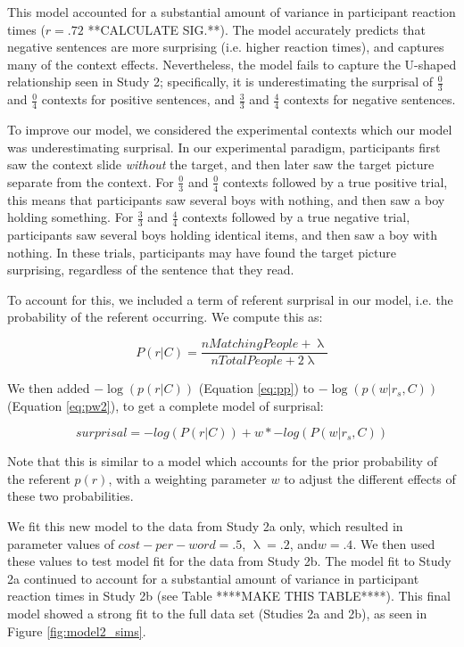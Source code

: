 \documentclass[10pt,letterpaper]{article}
\begin{document}
This model accounted for a substantial amount of variance in participant reaction times ($r=.72$ **CALCULATE SIG.**).  The model accurately predicts that negative sentences are more surprising (i.e. higher reaction times), and captures many of the context effects.  Nevertheless, the model fails to capture the U-shaped relationship seen in Study 2; specifically, it is underestimating the surprisal of $\frac{0}{3}$ and $\frac{0}{4}$ contexts for positive sentences, and $\frac{3}{3}$ and $\frac{4}{4}$ contexts for negative sentences.

To improve our model, we considered the experimental contexts which our model was underestimating surprisal.  In our experimental paradigm, participants first saw the context slide \emph{without} the target, and then later saw the target picture separate from the context.  For $\frac{0}{3}$ and $\frac{0}{4}$ contexts followed by a true positive trial, this means that participants saw several boys with nothing, and then saw a boy holding something.  For $\frac{3}{3}$ and $\frac{4}{4}$ contexts followed by a true negative trial, participants saw several boys holding identical items, and then saw a boy with nothing.  In these trials, participants may have found the target picture surprising, regardless of the sentence that they read.  

To account for this, we included a term of referent surprisal in our model, i.e. the probability of the referent occurring.  We compute this as: 

\begin{equation}\label{eq:pp}
P(r | C) =  \frac{n MatchingPeople  + \uplambda}{nTotalPeople + 2\uplambda}
\end{equation}

We then added $-\log(p(r|C))$ (Equation \ref{eq:pp}) to $-\log(p(w|r_s,C))$ (Equation \ref{eq:pw2}), to get a complete model of surprisal:

\begin{equation}\label{eq:total}
surprisal = -log(P(r|C)) + w*-log(P(w|r_s, C))
\end{equation}

Note that this is similar to a model which accounts for the prior probability of the referent $p(r)$, with a weighting parameter $w$ to adjust the different effects of these two probabilities.  

We fit this new model to the data from Study 2a only, which resulted in parameter values of $cost-per-word = .5$, $\uplambda=.2$, and$ w=.4$.  We then used these values to test model fit for the data from Study 2b.  The model fit to Study 2a continued to account for a substantial amount of variance in participant reaction times in Study 2b (see Table ****MAKE THIS TABLE****).  This final model showed a strong fit to the full data set (Studies 2a and 2b), as seen in Figure \ref{fig:model2_sims}.
\end{document}
